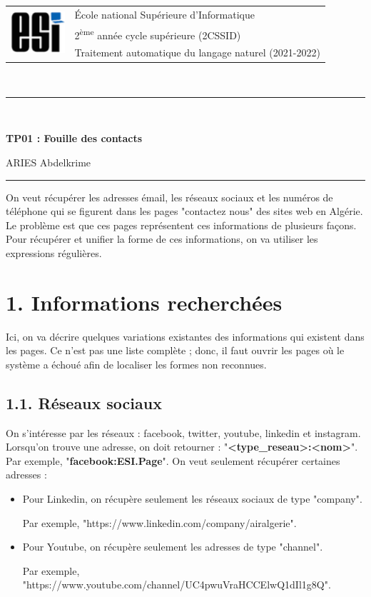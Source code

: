 \documentclass[11pt, a4paper]{article}
\begin{document}

\noindent
\begin{tabular}{ll}
\multirow{3}{*}{\includegraphics[width=2cm]{../../../img/esi-logo.png}} & \'Ecole national Supérieure d'Informatique\\
& 2\textsuperscript{ème} année cycle supérieure (2CSSID)\\
& Traitement automatique du langage naturel (2021-2022)
\end{tabular}\\[.25cm]
\noindent\rule{\textwidth}{1pt}\\%
\begin{center}
{\LARGE \textbf{TP01 : Fouille des contacts}}
\begin{flushright}
	ARIES Abdelkrime
\end{flushright}
\end{center}
\noindent\rule{\textwidth}{1pt}

On veut récupérer les adresses émail, les réseaux sociaux et les numéros de téléphone qui se figurent dans les pages "contactez nous" des sites web en Algérie. 
Le problème est que ces pages représentent ces informations de plusieurs façons.
Pour récupérer et unifier la forme de ces informations, on va utiliser les expressions régulières. 

\section*{1. Informations recherchées}

Ici, on va décrire quelques variations existantes des informations qui existent dans les pages.
Ce n'est pas une liste complète ; donc, il faut ouvrir les pages où le système a échoué afin de localiser les formes non reconnues.

\subsection*{1.1. Réseaux sociaux}

On s'intéresse par les réseaux : facebook, twitter, youtube, linkedin et instagram. 
Lorsqu'on trouve une adresse, on doit retourner : "\textbf{<type\_reseau>:<nom>}".
Par exemple, "\textbf{facebook:ESI.Page}".
On veut seulement récupérer certaines adresses :
\begin{itemize}
	\item Pour Linkedin, on récupère seulement les réseaux sociaux de type "company". 
	
	Par exemple, "https://www.linkedin.com/company/airalgerie".
	
	\item Pour Youtube, on récupère seulement les adresses de type "channel".
	
	Par exemple, "https://www.youtube.com/channel/UC4pwuVraHCCElwQ1dIl1g8Q".
\end{itemize}
\end{document}
